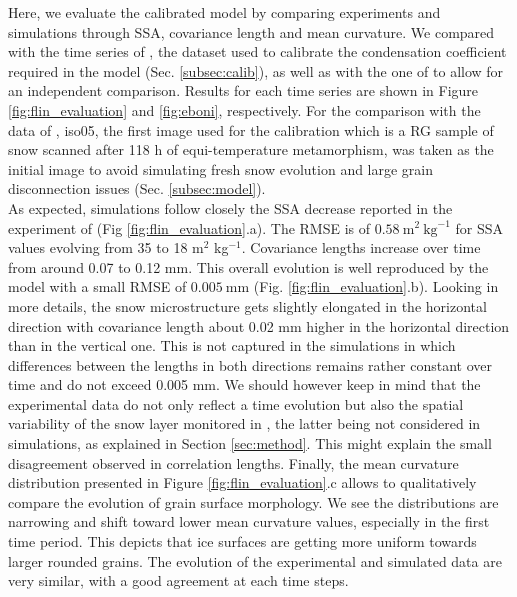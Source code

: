 \documentclass[draft,ms]{agujournal2019}
\begin{document}
 Here, we evaluate the calibrated model by comparing experiments and simulations through SSA, covariance length and mean curvature.
We compared with the time series of , the dataset used to calibrate the condensation coefficient required in the model (Sec. \ref{subsec:calib}), as well as with the one of  to allow for an independent comparison. Results for each time series are shown in Figure \ref{fig:flin_evaluation} and \ref{fig:eboni}, respectively. For the comparison with the data of , iso05, the first image used for the calibration which is a RG sample of snow scanned after 118 h of equi-temperature metamorphism, was taken as the initial image to avoid simulating fresh snow evolution and large grain disconnection issues (Sec. \ref{subsec:model}). \\

As expected, simulations follow closely the SSA decrease reported in the experiment of  (Fig \ref{fig:flin_evaluation}.a).
The RMSE is of $0.58\ \mathrm{m}^2\ \mathrm{kg}^{-1}$ for SSA values evolving from 35 to 18 m$^2$ kg$^{-1}$.
Covariance lengths increase over time from around 0.07 to 0.12 mm. This overall evolution is well reproduced by the model with a small RMSE of $0.005\ \mathrm{mm}$ (Fig. \ref{fig:flin_evaluation}.b). Looking in more details, the snow microstructure gets slightly elongated in the horizontal direction with covariance length about 0.02 mm higher in the horizontal direction than in the vertical one. This is not captured in the simulations in which differences between the lengths in both directions remains rather constant over time and do not exceed 0.005 mm. We should however keep in mind that the experimental data do not only reflect a time evolution but also the spatial variability of the snow layer monitored in , the latter being not considered in simulations, as explained in Section \ref{sec:method}. This might explain the small disagreement observed in correlation lengths.
Finally, the mean curvature distribution presented in Figure \ref{fig:flin_evaluation}.c allows to qualitatively compare the evolution of grain surface morphology. We see the distributions are narrowing and shift toward lower mean curvature values, especially in the first time period. This depicts that ice surfaces are getting more uniform towards larger rounded grains. The evolution of the experimental and simulated data are very similar, with a good agreement at each time steps.\\
\end{document}
